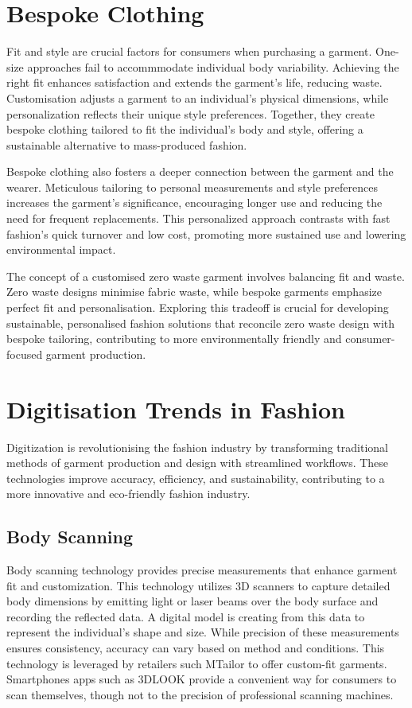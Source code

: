 \section{Bespoke Clothing}
Fit and style are crucial factors for consumers when purchasing a garment. One-size approaches fail to accommmodate individual body variability. Achieving the right fit enhances satisfaction and extends the garment's life, reducing waste. Customisation adjusts a garment to an individual's physical dimensions, while personalization reflects their unique style preferences. Together, they create bespoke clothing tailored to fit the individual's body and style, offering a sustainable alternative to mass-produced fashion.

Bespoke clothing also fosters a deeper connection between the garment and the wearer. Meticulous tailoring to personal measurements and style preferences increases the garment's significance, encouraging longer use and reducing the need for frequent replacements. This personalized approach contrasts with fast fashion's quick turnover and low cost, promoting more sustained use and lowering environmental impact.

The concept of a customised zero waste garment involves balancing fit and waste. Zero waste designs minimise fabric waste, while bespoke garments emphasize perfect fit and personalisation. Exploring this tradeoff is crucial for developing sustainable, personalised fashion solutions that reconcile zero waste design with bespoke tailoring, contributing to more environmentally friendly and consumer-focused garment production.

\section{Digitisation Trends in Fashion}
Digitization is revolutionising the fashion industry by transforming traditional methods of garment production and design with streamlined workflows. These technologies improve accuracy, efficiency, and sustainability, contributing to a more innovative and eco-friendly fashion industry.

\subsection{Body Scanning}
Body scanning technology provides precise measurements that enhance garment fit and customization. This technology utilizes 3D scanners to capture detailed body dimensions by emitting light or laser beams over the body surface and recording the reflected data. A digital model is creating from this data to represent the individual's shape and size. While precision of these measurements ensures consistency, accuracy can vary based on method and conditions. This technology is leveraged by retailers such  MTailor to offer custom-fit garments. Smartphones apps such as 3DLOOK provide a convenient way for consumers to scan themselves, though not to the precision of professional scanning machines.

